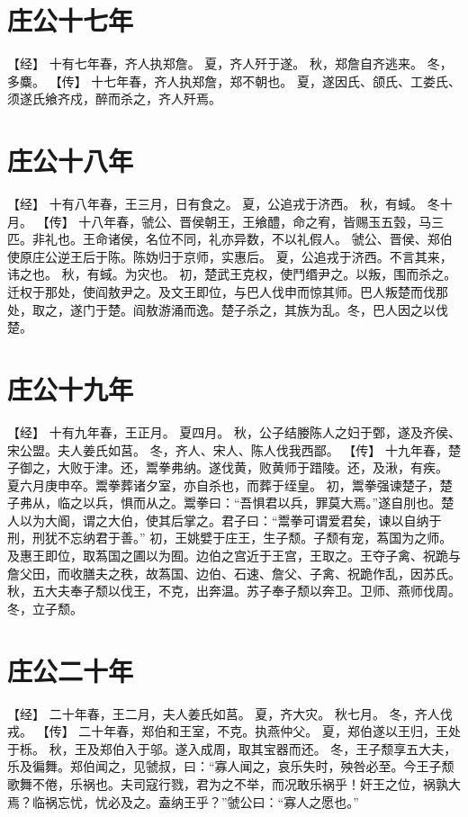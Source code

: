 \documentclass[a4paper,12pt,UTF8,twoside]{ctexbook}
\begin{document}
\section{庄公十七年}

【经】
十有七年春，齐人执郑詹。
夏，齐人歼于遂。
秋，郑詹自齐逃来。
冬，多麋。
【传】
十七年春，齐人执郑詹，郑不朝也。
夏，遂因氏、颌氏、工娄氏、须遂氏飨齐戍，醉而杀之，齐人歼焉。

\section{庄公十八年}

【经】
十有八年春，王三月，日有食之。
夏，公追戎于济西。
秋，有蜮。
冬十月。
【传】
十八年春，虢公、晋侯朝王，王飨醴，命之宥，皆赐玉五瑴，马三匹。非礼也。王命诸侯，名位不同，礼亦异数，不以礼假人。
虢公、晋侯、郑伯使原庄公逆王后于陈。陈妫归于京师，实惠后。
夏，公追戎于济西。不言其来，讳之也。
秋，有蜮。为灾也。
初，楚武王克权，使鬥缗尹之。以叛，围而杀之。迁权于那处，使阎敖尹之。及文王即位，与巴人伐申而惊其师。巴人叛楚而伐那处，取之，遂门于楚。阎敖游涌而逸。楚子杀之，其族为乱。冬，巴人因之以伐楚。

\section{庄公十九年}

【经】
十有九年春，王正月。
夏四月。
秋，公子结媵陈人之妇于鄄，遂及齐侯、宋公盟。夫人姜氏如莒。
冬，齐人、宋人、陈人伐我西鄙。
【传】
十九年春，楚子御之，大败于津。还，鬻拳弗纳。遂伐黄，败黄师于踖陵。还，及湫，有疾。
夏六月庚申卒。鬻拳葬诸夕室，亦自杀也，而葬于绖皇。
初，鬻拳强谏楚子，楚子弗从，临之以兵，惧而从之。鬻拳曰：“吾惧君以兵，罪莫大焉。”遂自刖也。楚人以为大阍，谓之大伯，使其后掌之。君子曰：“鬻拳可谓爱君矣，谏以自纳于刑，刑犹不忘纳君于善。”
初，王姚嬖于庄王，生子颓。子颓有宠，蒍国为之师。及惠王即位，取蒍国之圃以为囿。边伯之宫近于王宫，王取之。王夺子禽、祝跪与詹父田，而收膳夫之秩，故蒍国、边伯、石速、詹父、子禽、祝跪作乱，因苏氏。
秋，五大夫奉子颓以伐王，不克，出奔温。苏子奉子颓以奔卫。卫师、燕师伐周。
冬，立子颓。

\section{庄公二十年}

【经】
二十年春，王二月，夫人姜氏如莒。
夏，齐大灾。
秋七月。
冬，齐人伐戎。
【传】
二十年春，郑伯和王室，不克。执燕仲父。
夏，郑伯遂以王归，王处于栎。
秋，王及郑伯入于邬。遂入成周，取其宝器而还。
冬，王子颓享五大夫，乐及徧舞。郑伯闻之，见虢叔，曰：“寡人闻之，哀乐失时，殃咎必至。今王子颓歌舞不倦，乐祸也。夫司寇行戮，君为之不举，而况敢乐祸乎！奸王之位，祸孰大焉？临祸忘忧，忧必及之。盍纳王乎？”虢公曰：“寡人之愿也。”
\end{document}
